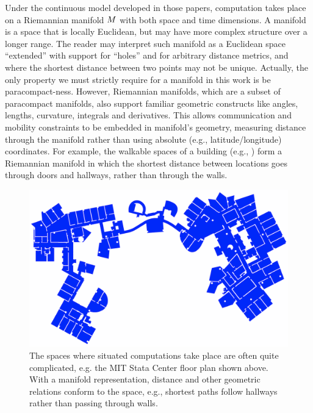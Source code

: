 \documentclass[12pt,a4paper,twoside,openright]{book}
\begin{document}
Under the continuous model developed in those papers, computation takes place on a Riemannian manifold $M$ with both space and time dimensions.
%
A manifold is a space that is locally Euclidean, but may have more complex structure over a longer range.
%
The reader may interpret such manifold as a Euclidean space ``extended'' with support for ``holes'' and for arbitrary distance metrics, and where the shortest distance between two points may not be unique.
%
Actually, the only property we must strictly require for a manifold in this work is be paracompact-ness.
%
However, Riemannian manifolds, which are a subset of paracompact manifolds, also support familiar geometric constructs like angles, lengths, curvature, integrals and derivatives.
%
This allows communication and mobility constraints to be embedded in manifold's geometry, measuring distance through the manifold rather than using absolute (e.g., latitude/longitude) coordinates.
%
For example, the walkable spaces of a building (e.g., ) form a Riemannian manifold in which the shortest distance between locations goes through doors and hallways, rather than through the walls.

\begin{figure}
\centering
\includegraphics[width=\columnwidth]{img/32_D5}
\caption[MIT Stata Center floor plan]{The spaces where situated computations take place are often quite complicated, e.g. the MIT Stata Center floor plan shown above. 
         With a manifold representation, distance and other geometric relations conform to the space, e.g., shortest paths follow hallways rather than passing through walls.}
\label{f:manifold}
\end{figure}
\end{document}
